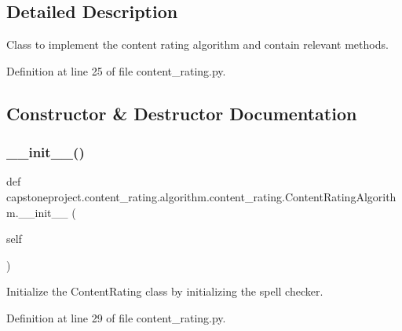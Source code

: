 \subsection{Detailed Description}
\begin{DoxyVerb}Class to implement the content rating algorithm and contain relevant methods.
\end{DoxyVerb}
 

Definition at line 25 of file content\+\_\+rating.\+py.



\subsection{Constructor \& Destructor Documentation}
\mbox{\label{classcapstoneproject_1_1content__rating_1_1algorithm_1_1content__rating_1_1_content_rating_algorithm_abc5f346185684c1797fbd7338662deac}} 
\subsubsection{\texorpdfstring{\+\_\+\+\_\+init\+\_\+\+\_\+()}{\_\_init\_\_()}}
{\footnotesize\ttfamily def capstoneproject.\+content\+\_\+rating.\+algorithm.\+content\+\_\+rating.\+Content\+Rating\+Algorithm.\+\_\+\+\_\+init\+\_\+\+\_\+ (\begin{DoxyParamCaption}\item[{}]{self }\end{DoxyParamCaption})}

\begin{DoxyVerb}Initialize the ContentRating class by initializing the spell checker.
\end{DoxyVerb}
 

Definition at line 29 of file content\+\_\+rating.\+py.



